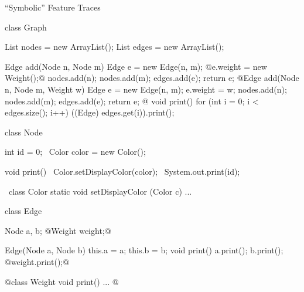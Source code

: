 \begin{frame}[fragile]{``Symbolic'' Feature Traces}
	\small
	\begin{fancycolumns}[t,columns=3,widths={43,30,32}]
\begin{codetight}{}
class Graph {
	List nodes = new ArrayList();
	List edges = new ArrayList();

	Edge add(Node n, Node m) {
		Edge e = new Edge(n, m);
		@e.weight = new Weight();@
		nodes.add(n); nodes.add(m); edges.add(e);
		return e;
	}
	@Edge add(Node n, Node m, Weight w) {
		Edge e = new Edge(n, m);
		e.weight = w;
		nodes.add(n); nodes.add(m); edges.add(e);
		return e;
	}@
	void print() {
		for (int i = 0; i < edges.size(); i++) {
			((Edge) edges.get(i)).print();
		}
	}
}
\end{codetight}
	\nextcolumn
\begin{codetight}{}
class Node {
	int id = 0;
	~Color color = new Color();~

	void print() {
		~Color.setDisplayColor(color);~
		System.out.print(id);
	}
}
\end{codetight}
\begin{codetight}{}
~class Color {
	static void setDisplayColor
		(Color c) {...}
}~
\end{codetight}
	\nextcolumn
\begin{codetight}{}
class Edge {
	Node a, b;
	@Weight weight;@

	Edge(Node a, Node b) {
		this.a = a; this.b = b;
	}
	void print() {
		a.print(); b.print();
		@weight.print();@
	}
}
\end{codetight}
\begin{codetight}{}
@class Weight {
	void print() {...}
}@
\end{codetight}
	\end{fancycolumns}
\end{frame}

